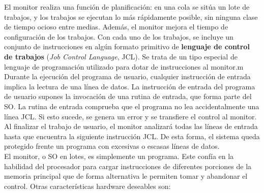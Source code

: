 \documentclass{article}
\begin{document}
					El monitor realiza una función de planificación: en una cola se sitúa un lote de trabajos, y los trabajos se ejecutan lo más rápidamente posible, sin ninguna clase de tiempo ocioso entre medias. Además, el monitor mejora el tiempo de configuración de los trabajos. Con cada uno de los trabajos, se incluye un conjunto de instrucciones en algún formato primitivo de \textbf{lenguaje de control de trabajos} (\textit{Job Control Language}, JCL). Se trata de un tipo especial de lenguaje de programación utilizado para dotar de instrucciones al monitor.m\\
					
					Durante la ejecución del programa de usuario, cualquier instrucción de entrada implica la lectura de una línea de datos. La instrucción de entrada del programa de usuario supones la invocación de una rutina de entrada, que forma parte del SO. La rutina de entrada comprueba que el programa no lea accidentalmente una línea JCL. Si esto sucede, se genera un error y se transfiere el control al monitor. Al finalizar el trabajo de usuario, el monitor analizará todas las líneas de entrada hasta que encuentra la siguiente instrucción JCL. De esta forma, el sistema queda protegido frente un programa con excesivas o escasas líneas de datos. \\
					
					El monitor, o SO en lotes, es simplemente un programa. Este confía en la habilidad del procesador para cargar instrucciones de diferentes porciones de la memoria principal que de forma alternativa le permiten tomar y abandonar el control. Otras características hardware deseables son:
					
\end{document}

